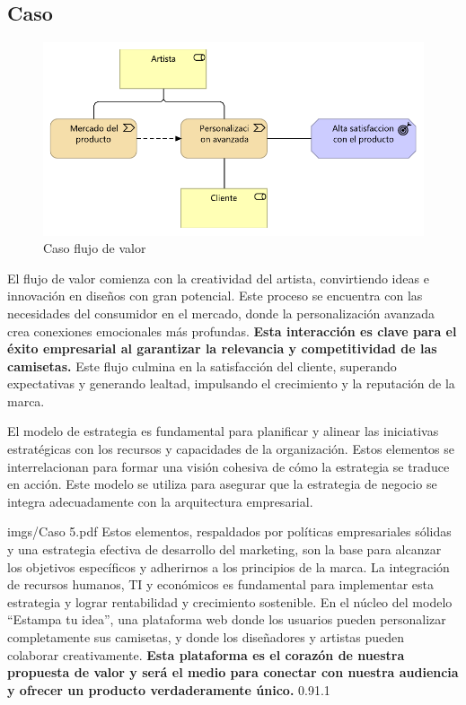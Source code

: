 \subsection{Caso}
\begin{figure}[H]
	\centering	
    \includegraphics[width=0.9\linewidth]{imgs/Caso 4.pdf}
	\caption{Caso flujo de valor}	
 \end{figure}
 
El flujo de valor comienza con la creatividad del artista, convirtiendo ideas e innovación en diseños con gran potencial. Este proceso se encuentra con las necesidades del consumidor en el mercado, donde la personalización avanzada crea conexiones emocionales más profundas. \textbf{Esta interacción es clave para el éxito empresarial al garantizar la relevancia y competitividad de las camisetas.} Este flujo culmina en la satisfacción del cliente, superando expectativas y generando lealtad, impulsando el crecimiento y la reputación de la marca.

{
  El modelo de estrategia es fundamental para planificar y alinear las iniciativas estratégicas con los recursos y capacidades de la organización. Estos elementos se interrelacionan para formar una visión cohesiva de cómo la estrategia se traduce en acción. Este modelo se utiliza para asegurar que la estrategia de negocio se integra adecuadamente con la arquitectura empresarial.

}
{imgs/Caso 5.pdf}
{
Estos elementos, respaldados por políticas empresariales sólidas y una estrategia efectiva de desarrollo del marketing, son la base para alcanzar los objetivos específicos y adherirnos a los principios de la marca. La integración de recursos humanos, TI y económicos es fundamental para implementar esta estrategia y lograr rentabilidad y crecimiento sostenible. En el núcleo del modelo “Estampa tu idea”, una plataforma web donde los usuarios pueden personalizar completamente sus camisetas, y donde los diseñadores  y artistas pueden colaborar creativamente. \textbf{Esta plataforma es el corazón de nuestra propuesta de valor y será el medio para conectar con nuestra audiencia y ofrecer un producto verdaderamente único.}
}{0.9}{1.1}
